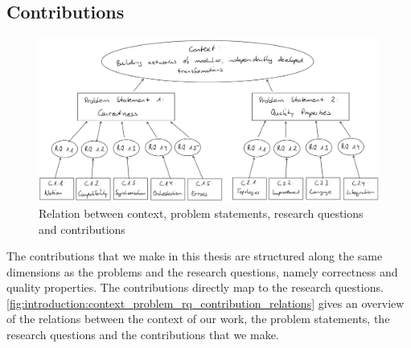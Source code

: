 

\subsection{Contributions}

\begin{figure}
    \centering
    \includegraphics[width=\textwidth]{figures/prologue/introduction/context_problem_eq_contribution_relations.png}
    \caption[Context, problems, research questions and contributions]{Relation between context, problem statements, research questions and contributions}
    \label{fig:introduction:context_problem_rq_contribution_relations}
\end{figure}

The contributions that we make in this thesis are structured along the same dimensions as the problems and the research questions, namely correctness and quality properties.
The contributions directly map to the research questions.
\autoref{fig:introduction:context_problem_rq_contribution_relations} gives an overview of the relations between the context of our work, the problem statements, the research questions and the contributions that we make.

